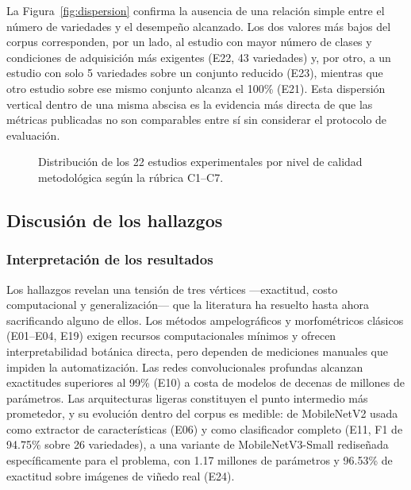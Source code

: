 La Figura~\ref{fig:dispersion} confirma la ausencia de una relación simple
entre el número de variedades y el desempeño alcanzado. Los dos valores más
bajos del corpus corresponden, por un lado, al estudio con mayor número de
clases y condiciones de adquisición más exigentes (E22, 43 variedades) y, por
otro, a un estudio con solo 5 variedades sobre un conjunto reducido (E23),
mientras que otro estudio sobre ese mismo conjunto alcanza el 100\% (E21).
Esta dispersión vertical dentro de una misma abscisa es la evidencia más
directa de que las métricas publicadas no son comparables entre sí sin
considerar el protocolo de evaluación.

\begin{figure}[htbp]
\centering
{}
\caption{Distribución de los 22 estudios experimentales por nivel de calidad
metodológica según la rúbrica C1--C7.}
\label{fig:calidad}
\end{figure}

\subsection{Discusión de los hallazgos}

\subsubsection{Interpretación de los resultados}

Los hallazgos revelan una tensión de tres vértices —exactitud, costo
computacional y generalización— que la literatura ha resuelto hasta ahora
sacrificando alguno de ellos. Los métodos ampelográficos y morfométricos
clásicos (E01--E04, E19) exigen recursos computacionales mínimos y ofrecen
interpretabilidad botánica directa, pero dependen de mediciones manuales que
impiden la automatización. Las redes convolucionales profundas alcanzan
exactitudes superiores al 99\% (E10) a costa de modelos de decenas de
millones de parámetros. Las arquitecturas ligeras constituyen el punto
intermedio más prometedor, y su evolución dentro del corpus es medible: de
MobileNetV2 usada como extractor de características (E06) y como clasificador
completo (E11, F1 de 94.75\% sobre 26 variedades), a una variante de
MobileNetV3-Small rediseñada específicamente para el problema, con 1.17
millones de parámetros y 96.53\% de exactitud sobre imágenes de viñedo real
(E24).

